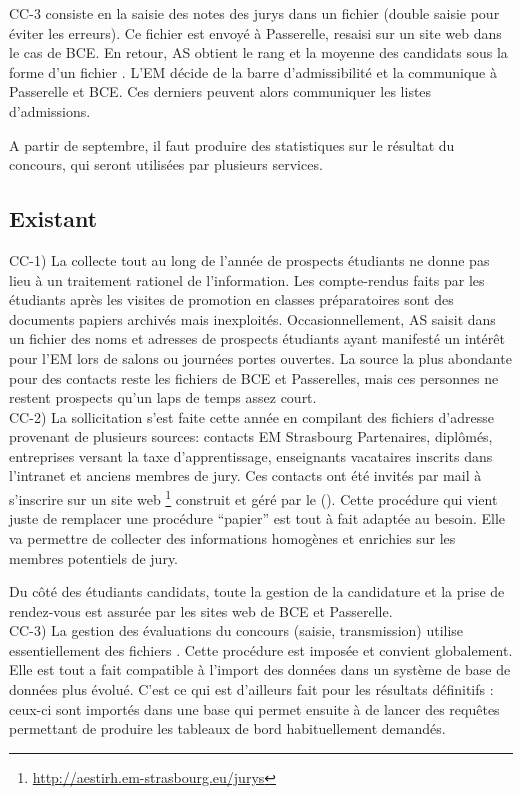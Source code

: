 \documentclass{book}
\begin{document}
CC-3 consiste en la saisie des notes des jurys dans un fichier
 (double saisie pour éviter les erreurs). Ce fichier est 
envoyé à Passerelle, resaisi sur un site web dans le cas de BCE.
En retour, AS obtient le rang et la moyenne des candidats sous
la forme d'un fichier . L'EM décide de la barre d'admissibilité
et la communique à Passerelle et BCE. Ces derniers peuvent alors
communiquer les listes d'admissions.

A partir de septembre, il faut produire des statistiques sur le
résultat du concours, qui seront utilisées par plusieurs services.


\subsection{Existant}
CC-1) 
La collecte tout au long de l'année de prospects étudiants
ne donne pas lieu à un traitement rationel de l'information.
Les compte-rendus faits par les étudiants après les visites de
promotion en classes préparatoires sont des documents papiers
archivés mais inexploités. Occasionnellement, AS saisit dans un
fichier  des noms et adresses de prospects étudiants ayant 
manifesté un intérêt pour l'EM lors de salons ou journées portes 
ouvertes. La source la plus abondante pour des contacts reste
les fichiers de BCE et Passerelles, mais ces personnes ne restent
prospects qu'un laps de temps assez court.\\


CC-2)
La sollicitation s'est faite cette année en compilant des
fichiers d'adresse provenant de plusieurs sources: contacts
EM Strasbourg Partenaires, diplômés, entreprises versant la
taxe d'apprentissage, enseignants vacataires inscrits dans
l'intranet et anciens membres de jury. Ces contacts ont été
invités par mail à s'inscrire sur un site web%
\footnote{\url{http://aestirh.em-strasbourg.eu/jurys}}
construit et géré par le \scom (\NB).
Cette procédure qui vient juste de remplacer une procédure
``papier'' est tout à fait adaptée au besoin. Elle va permettre
de collecter des informations homogènes et enrichies sur les
membres potentiels de jury.

Du côté des étudiants candidats, toute la gestion de la 
candidature et la prise de rendez-vous est assurée par 
les sites web de BCE et Passerelle.\\

CC-3) 
La gestion des évaluations du concours (saisie, transmission)
utilise essentiellement des fichiers . Cette procédure
est imposée et convient globalement. Elle est tout a fait 
compatible à l'import des données dans un système de base de
données plus évolué.
C'est ce qui est d'ailleurs fait pour les résultats définitifs :
ceux-ci sont importés dans une base  qui permet ensuite
à \CK de lancer des requêtes permettant de produire les tableaux
de bord habituellement demandés. 
\end{document}
